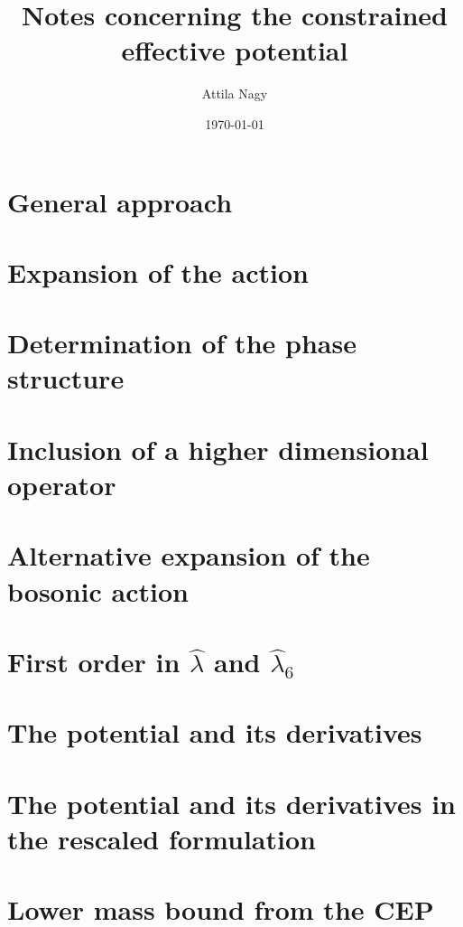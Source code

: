 \documentclass[a4paper,10pt,final]{article}
\title{Notes concerning the constrained effective potential}
\author{Attila Nagy}
\date{\today}
\numberwithin{equation}{section} %
\begin{document}
\section{General approach}

%
\clearpage
%
\section{Expansion of the action}

%
\clearpage
%
\section{Determination of the phase structure}

%
\clearpage
%
\section{Inclusion of a higher dimensional operator}

%
\clearpage
%
\section{Alternative expansion of the bosonic action}

%
\clearpage
%
\section{\texorpdfstring{First order in $\hat\lambda$ and $\hat\lambda_6$}{First order in lambda and lambda6}}

%
\clearpage
%
\section{The potential and its derivatives}

%
\clearpage
%
\section{The potential and its derivatives in the rescaled formulation}

%
\clearpage
%
\section{Lower mass bound from the CEP}


% 
% 
%
\end{document}
